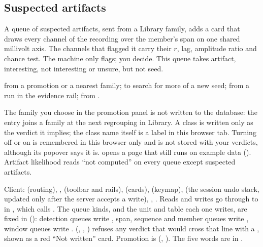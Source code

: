 
\subsection{Suspected artifacts}\label{sec:review-suspected}
A queue of suspected artifacts, sent from a Library family, adds a card that draws every
channel of the recording over the member's span on one shared millivolt axis. The channels
that flagged it carry their $r$, lag, amplitude ratio and chance test. The machine only
flags; you decide. This queue takes artifact, interesting, not interesting or unsure, but
not seed.

 from a promotion or a nearest family;  to
search for more of a new seed;  from a run in the evidence rail;
 from .

\begin{watchout}
The family you choose in the promotion panel is not written to the database: the entry joins
a family at the next regrouping in Library. A class is written only as the verdict it
implies; the class name itself is a label in this browser tab. Turning  off or on is remembered in this browser only and is not stored with your verdicts,
although its popover says it is.  opens a page that still runs on
example data (). Artifact likelihood reads ``not computed'' on every
queue except suspected artifacts.
\end{watchout}

\begin{underthehood}[Inspector]
Client:  (routing), ,
 (toolbar and rails),  (cards),  (keymap),
 (the session undo stack, updated only after the server accepts a write),
, . Reads and writes go through
 to  in
, which calls . The queue kinds, and the
unit and table each one writes, are fixed in 
(): detection queues write , span, sequence and member
queues write , window queues write .
 (, ,
) refuses any verdict that would cross that line with a
, shown as a red ``Not written'' card. Promotion is
 (, ). The five words are
 in .
\end{underthehood}

